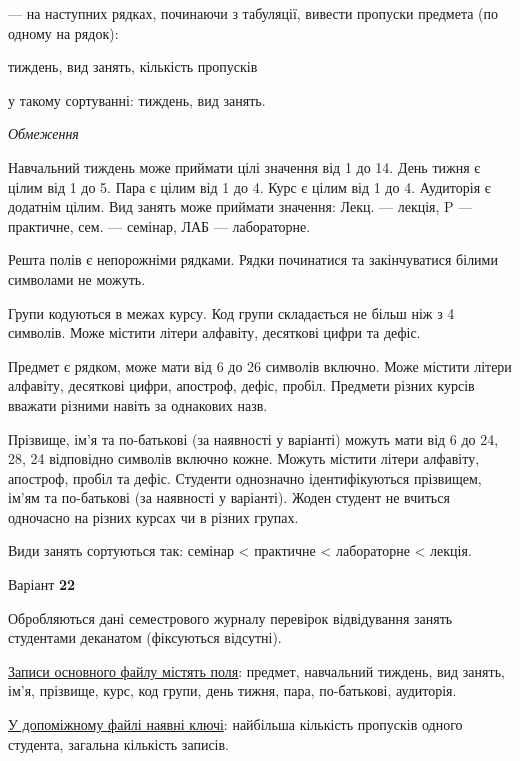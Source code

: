 \documentclass[11pt, ukrainian]{article}
\begin{document}
{\noindent}--- на наступних рядках, починаючи з табуляції, вивести пропуски предмета (по одному на рядок):\par
тиждень, вид занять, кількість пропусків

{\noindent}у такому сортуванні: тиждень, вид занять.


\bigskip\textit{Обмеження}

Навчальний тиждень може приймати цілі значення від 1 до 14.
День тижня є цілим від 1 до 5. Пара є цілим від 1 до 4.
Курс є цілим від 1 до 4. Аудиторія є додатнім цілим.
Вид занять може приймати значення:
Лекц. --- лекція, P --- практичне, сем. --- семінар, ЛАБ --- лабораторне.

Решта полів є непорожніми рядками.
Рядки починатися та закінчуватися білими символами не можуть.

Групи кодуються в межах курсу.
Код групи складається не більш ніж з 4 символів.
Може містити літери алфавіту, десяткові цифри та дефіс.

Предмет є рядком, може мати від 6 до 26 символів включно.
Може містити літери алфавіту, десяткові цифри, апостроф, дефіс, пробіл.
Предмети різних курсів вважати різними навіть за однакових назв.

Прізвище, ім’я та по-батькові (за наявності у варіанті)
можуть мати від 6 до 24, 28, 24 відповідно символів включно кожне.
Можуть містити літери алфавіту, апостроф, пробіл та дефіс.
Студенти однозначно ідентифікуються прізвищем, ім’ям та по-батькові (за наявності у варіанті).
Жоден студент не вчиться одночасно на різних курсах чи в різних групах.

Види занять сортуються так: семінар < практичне < лабораторне < лекція.



\par
\newpage
{\center Варіант  \No \textbf { 22 }\par}
\bigskip
Обробляються дані семестрового журналу перевірок відвідування занять студентами деканатом (фіксуються відсутні). 

\underline{Записи основного файлу містять поля}: предмет, навчальний тиждень, вид занять, ім’я, прізвище, курс, код групи, день тижня, пара, по-батькові, аудиторія.

\underline{У допоміжному файлі наявні ключі}: найбільша кількість пропусків одного студента, загальна кількість записів.
\end{document}

